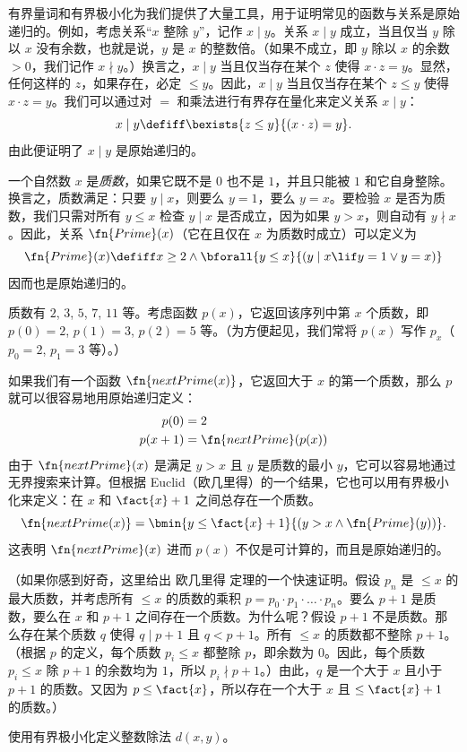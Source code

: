\documentclass[../../../include/open-logic-section]{subfiles}
\begin{document}

有界量词和有界极小化为我们提供了大量工具，用于证明常见的函数与关系是原始递归的。例如，考虑关系“$x$ 整除 $y$”，记作 $x \mid y$。关系 $x \mid y$ 成立，当且仅当 $y$ 除以 $x$ 没有余数，也就是说，$y$ 是 $x$ 的整数倍。（如果不成立，即 $y$ 除以 $x$ 的余数 $> 0$，我们记作 $x \nmid y$。）换言之，$x \mid y$ 当且仅当存在某个 $z$ 使得 $x \cdot z = y$。显然，任何这样的 $z$，如果存在，必定 $\le y$。因此，$x \mid y$ 当且仅当存在某个 $z \le y$ 使得 $x \cdot z = y$。我们可以通过对 $=$ 和乘法进行有界存在量化来定义关系 $x \mid y$：
\[
x \mid y \defiff \bexists{z \leq y}{(x \cdot z) = y}.
\]
由此便证明了 $x \mid y$ 是原始递归的。

一个自然数 $x$ 是\emph{质数}，如果它既不是 $0$ 也不是 $1$，并且只能被 $1$ 和它自身整除。换言之，质数满足：只要 $y \mid x$，则要么 $y = 1$，要么 $y=x$。要检验 $x$ 是否为质数，我们只需对所有 $y \le x$ 检查 $y \mid x$ 是否成立，因为如果 $y > x$，则自动有 $y \nmid x$。因此，关系 $\fn{Prime}(x)$（它在且仅在 $x$ 为质数时成立）可以定义为
\[
\fn{Prime}(x) \defiff x \geq 2 \land \bforall{y \leq x}{(y \mid x \lif y
  = 1 \lor y = x)}
\]
因而也是原始递归的。

质数有 $2$, $3$, $5$, $7$, $11$ 等。考虑函数 $p(x)$，它返回该序列中第 $x$ 个质数，即 $p(0) = 2$, $p(1) = 3$, $p(2) = 5$ 等。（为方便起见，我们常将 $p(x)$ 写作 $p_x$（$p_0=2$, $p_1=3$ 等）。）

如果我们有一个函数 $\fn{nextPrime(x)}$，它返回大于 $x$ 的第一个质数，那么 $p$ 就可以很容易地用原始递归定义：
\begin{align*}
  p(0) & = 2\\
  p(x+1) & = \fn{nextPrime}(p(x))
\end{align*}
由于 $\fn{nextPrime}(x)$ 是满足 $y > x$ 且 $y$ 是质数的最小 $y$，它可以容易地通过无界搜索来计算。但根据 Euclid（欧几里得）的一个结果，它也可以用有界极小化来定义：在 $x$ 和 $\fact{x}+1$ 之间总存在一个质数。
\[
  \fn{nextPrime(x)} =
  \bmin{y \leq \fact{x}+1}{(y > x \land \fn{Prime}(y))}.
\]
这表明 $\fn{nextPrime}(x)$ 进而 $p(x)$ 不仅是可计算的，而且是原始递归的。

（如果你感到好奇，这里给出 欧几里得 定理的一个快速证明。假设 $p_n$ 是 $\le x$ 的最大质数，并考虑所有 $\le x$ 的质数的乘积 $p =
p_0\cdot p_1 \cdot \dots \cdot p_n$。要么 $p+1$ 是质数，要么在 $x$ 和 $p+1$ 之间存在一个质数。为什么呢？假设 $p+1$ 不是质数。那么存在某个质数 $q$ 使得 $q \mid p+1$ 且 $q < p+1$。所有 $\le x$ 的质数都不整除 $p+1$。（根据 $p$ 的定义，每个质数 $p_i \le x$ 都整除 $p$，即余数为 $0$。因此，每个质数 $p_i \le x$ 除 $p+1$ 的余数均为 $1$，所以 $p_i \nmid p+1$。）由此，$q$ 是一个大于 $x$ 且小于 $p+1$ 的质数。又因为 $p \le \fact{x}$，所以存在一个大于 $x$ 且 $\le \fact{x}+1$ 的质数。）

\begin{prob}
使用有界极小化定义整数除法 $d(x, y)$。
\end{prob}
\end{document}
